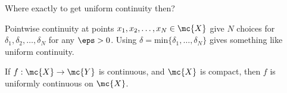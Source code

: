 Where exactly to get uniform continuity then?
\begin{idea}
	Pointwise continuity at points \(x_1,x_2,\dots,x_N\in\mc{X}\) give \(N\) choices for \(\delta_1,\delta_2,\dots,\delta_N\) for any \(\eps>0\). Using \(\delta=\text{min}\{\delta_1,\dots,\delta_N\}\) gives something like uniform continuity.
\end{idea}
\begin{ntheorem}{}
	If \(f:\mc{X}\to\mc{Y}\) is continuous, and \(\mc{X}\) is compact, then \(f\) is uniformly continuous on \(\mc{X}\).
\end{ntheorem}